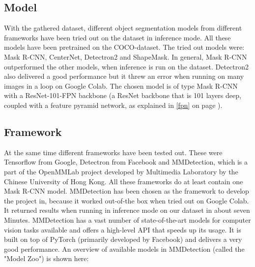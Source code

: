 \subsection{Model}

With the gathered dataset, different object segmentation models from different frameworks have been tried out on the dataset in inference mode. All these models have been pretrained on the COCO-dataset.
The tried out models were: Mask R-CNN, CenterNet, Detectron2 and ShapeMask. In general, Mask R-CNN outperformed the other models, when inference is run on the dataset. Detectron2 also delivered a good performance but it threw an error when running on many images in a loop on Google Colab. The chosen model is of type Mask R-CNN with a ResNet-101-FPN backbone (a ResNet backbone that is 101 layers deep, coupled with a feature pyramid network, as explained in \ref{fpn} on page \pageref{fpn}).

\subsection{Framework}

At the same time different frameworks have been tested out. These were Tensorflow from Google, Detectron from Facebook and MMDetection, which is a part of the OpenMMLab project developed by Multimedia Laboratory by the Chinese University of Hong Kong. All these frameworks do at least contain one Mask R-CNN model. MMDetection has been chosen as the framework to develop the project in, because it worked out-of-the box when tried out on Google Colab. It returned results when running in inference mode on our dataset in about seven Minutes. MMDetection has a vast number of state-of-the-art models for computer vision tasks available and offers a high-level API that speeds up its usage. It is built on top of PyTorch (primarily developed by Facebook) and delivers a very good performance. An overview of available models in MMDetection (called the "Model Zoo") is shown here:

